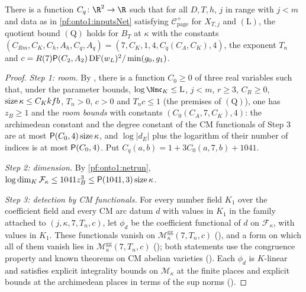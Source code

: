 \begin{theorem}\label{pf:onto1:qAt}
There is a function $C_q\colon\R^2\to\R$ such that for all $D,T,h$, $j$ in range with $j<m$ and data as in
\cref{pf:onto1:inputsNet} satisfying $\mathcal C^+_{\mathrm{page}}$ for $X_{T,j}$ and $(\mathrm L)$, the quotient bound $(\mathrm Q)$
holds for $B_T$ at $\kappa$ with the constants $(C_{Rm},C_K,C_h,A_h,C_q,A_q)=(7,C_K,1,4,C_q(C_A,C_K),4)$, the exponent $T_n$ and
$c=R(7)\mathsf{P}(C_2,A_2)\operatorname{DF}(w_L)^2/\min(g_0,g_1)$.
\end{theorem}

\begin{proof}
\emph{Step 1: room.} By , there is a function
$C_0\ge0$ of three real variables such that, under the parameter bounds, $\log\Nm\mathfrak c_K\le\mathrm L$, $j<m$, $r\ge3$, $C_R\ge0$,
$\operatorname{size}\kappa\le C_Kkfb$, $T_n>0$, $c>0$ and $T_nc\le1$ (the premises of $(\mathrm Q)$), one has $z_B\ge1$ and the \emph{room
bounds} with constants $(C_0(C_A,7,C_K),4)$: the archimedean constant and the degree constant of the CM functionals of Step 3
are at most $\mathsf{P}(C_0,4)\operatorname{size}\kappa$, and $\log|d_E|$ plus the logarithm of their number of indices is at most
$\mathsf{P}(C_0,4)$. Put $C_q(a,b)=1+3C_0(a,7,b)+1041$.

\emph{Step 2: dimension.} By \cref{pf:onto1:netrun}, $\log\dim_K\mathcal F_\kappa\le1041z_B^3\le\mathsf{P}(1041,3)\operatorname{size}\kappa$.

\emph{Step 3: detection by CM functionals.} For every number field $K_1$ over the coefficient field and every CM arc datum
$d$ with values in $K_1$ in the family attached to $(j,\kappa,7,T_n,c)$, let $\phi_d$ be the coefficient functional of $d$ on
$\mathcal F_\kappa$, with values in $K_1$. These functionals vanish on $\mathcal M^{\mathrm{gg}}_\kappa(7,T_n,c)$
(), and a form on which all of them vanish lies in $\mathcal M^{\mathrm{gg}}_\kappa(7,T_n,c)$
(); both statements use the congruence property and known
theorems on CM abelian varieties (). Each $\phi_d$ is $K$-linear and
satisfies explicit integrality bounds on $\mathcal M_\kappa$ at the finite places and explicit bounds at the archimedean places in
terms of the sup norms ().


\end{proof}
